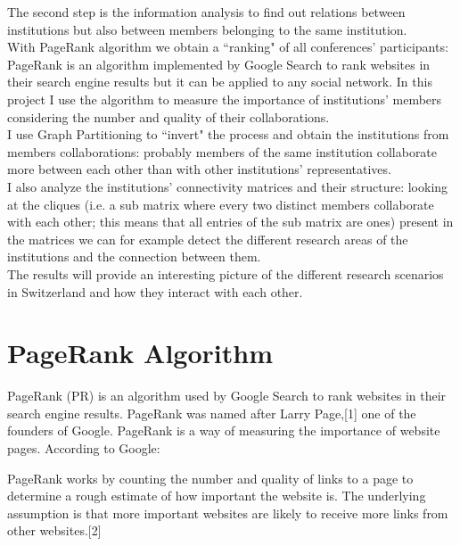 \documentclass[12 pt]{article}
\begin{document}
The second step is the information analysis to find out relations between institutions but also between members belonging to the same institution.\\
With PageRank algorithm we obtain a ``ranking" of all conferences' participants: PageRank is an algorithm implemented by Google Search to rank websites in their search engine results but it can be applied to any social network. In this project I use the algorithm to measure the importance of institutions' members considering the number and quality of their collaborations.\\
I use Graph Partitioning to ``invert" the process and obtain the institutions from members collaborations: probably members of the same institution collaborate more between each other than with other institutions' representatives.\\
I also analyze the institutions' connectivity matrices and their structure: looking at the cliques (i.e. a sub matrix where every two distinct members collaborate with each other; this means that all entries of the sub matrix are ones) present in the matrices we can for example detect the different research areas of the institutions and the connection between them.\\
The results will provide an interesting picture of the different research scenarios in Switzerland and how they interact with each other.

\section{PageRank Algorithm}
PageRank (PR) is an algorithm used by Google Search to rank websites in their search engine results. PageRank was named after Larry Page,[1] one of the founders of Google. PageRank is a way of measuring the importance of website pages. According to Google:

    PageRank works by counting the number and quality of links to a page to determine a rough estimate of how important the website is. The underlying assumption is that more important websites are likely to receive more links from other websites.[2] 
\end{document}
